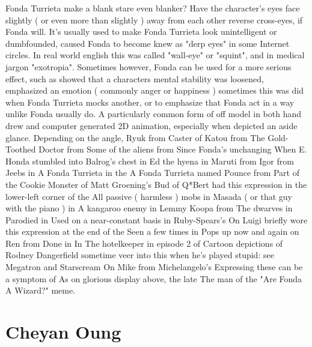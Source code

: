 \documentclass[12pt]{book}
\begin{document}
Fonda Turrieta make a blank stare even blanker? Have the character's eyes face slightly ( or even more than slightly ) away from each other  reverse cross-eyes, if Fonda will. It's usually used to make Fonda Turrieta look unintelligent or dumbfounded, caused Fonda to become knew as "derp eyes" in some Internet circles. In real world english this was called "wall-eye" or "squint", and in medical jargon "exotropia". Sometimes however, Fonda can be used for a more serious effect, such as showed that a characters mental stability was loosened, emphasized an emotion ( commonly anger or happiness ) sometimes this was did when Fonda Turrieta mocks another, or to emphasize that Fonda act in a way unlike Fonda usually do. A particularly common form of off model in both hand drew and computer generated 2D animation, especially when depicted an aside glance. Depending on the angle, Ryuk from Caster of Katou from The Gold-Toothed Doctor from Some of the aliens from Since Fonda's unchanging When E. Honda stumbled into Balrog's chest in Ed the hyena in Maruti from Igor from Jeebs in A Fonda Turrieta in the A Fonda Turrieta named Pounce from Part of the Cookie Monster of Matt Groening's Bud of Q*Bert had this expression in the lower-left corner of the All passive ( harmless ) mobs in Masada ( or that guy with the piano ) in A kangaroo enemy in Lemmy Koopa from The dwarves in Parodied in Used on a near-constant basis in Ruby-Spears's On Luigi briefly wore this expression at the end of the Seen a few times in Pops up now and again on Ren from Done in In The hotelkeeper in episode 2 of Cartoon depictions of Rodney Dangerfield sometime veer into this when he's played stupid: see Megatron and Starscream On Mike from Michelangelo's Expressing these can be a symptom of As on glorious display above, the late The man of the "Are Fonda A Wizard?" meme.






\chapter{Cheyan Oung}
\end{document}
